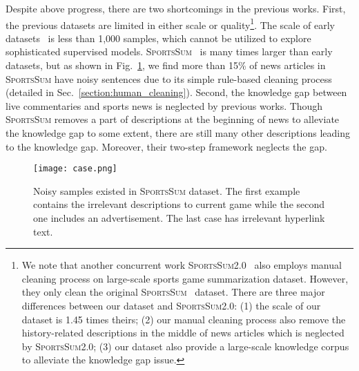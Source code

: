 Despite above progress, there are two shortcomings in the previous works.
First, the previous datasets are limited in either scale or quality\footnote{We note that another concurrent work \textsc{SportsSum2.0}~\cite{Wang2021SportsSum20GH} also employs manual cleaning process on large-scale sports game summarization dataset. However, they only clean the original \textsc{SportsSum}~\cite{Huang2020GeneratingSN} dataset. There are three major differences between our dataset and \textsc{SportsSum2.0}: (1) the scale of our dataset is 1.45 times theirs; (2) our manual cleaning process also remove the history-related descriptions in the middle of news articles which is neglected by \textsc{SportsSum2.0}; (3) our dataset also provide a large-scale knowledge corpus to alleviate the knowledge gap issue.}. The scale of early datasets~\cite{zhang-etal-2016-towards,Wan2016OverviewOT} is less than 1,000 samples, which cannot be utilized to explore sophisticated supervised models.  \textsc{SportsSum}~\cite{Huang2020GeneratingSN} is many times larger than early datasets, but as shown in Fig.~\ref{noisy_samples}, we find more than 15\% of news articles in \textsc{SportsSum} have noisy sentences due to its simple rule-based cleaning process (detailed in Sec.~\ref{section:human_cleaning}).
Second, the knowledge gap between live commentaries and sports news is neglected by previous works. Though \textsc{SportsSum} removes a part of descriptions at the beginning of news to alleviate the knowledge gap to some extent, there are still many other descriptions leading to the knowledge gap. Moreover, their two-step framework neglects the gap.

\begin{figure}[t]
\centerline{\texttt{[image: case.png]}}
\setlength{\belowcaptionskip}{-10pt}
\caption{Noisy samples existed in \textsc{SportsSum} dataset. The first example contains the irrelevant descriptions to current game while the second one includes an advertisement. The last case has irrelevant hyperlink text.}
\label{noisy_samples}
\end{figure}

